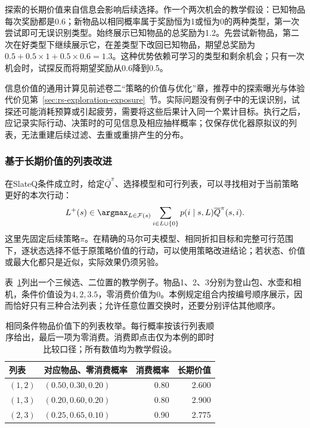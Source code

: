 探索的长期价值来自信息会影响后续选择。作一个两次机会的教学假设：已知物品每次奖励都是0.6；新物品以相同概率属于奖励恒为1或恒为0的两种类型，第一次尝试即可无误识别类型。始终展示已知物品的总奖励为1.2。先尝试新物品，第二次在好类型下继续展示它，在差类型下改回已知物品，期望总奖励为$0.5+0.5\times1+0.5\times0.6=1.3$。这种优势依赖可学习的类型和剩余机会；只有一次机会时，试探反而将期望奖励从0.6降到0.5。

信息价值的通用计算见前述卷二“策略的价值与优化”章，推荐中的探索曝光与体验代价见第~\ref{sec:rs-exploration-exposure}~节。实际问题没有例子中的无误识别，试探还可能消耗预算或引起疲劳，需要将这些后果计入同一个累计目标。执行之后，应记录实际行动、决策时的可见信息及相应抽样概率；仅保存优化器原拟议的列表，无法重建后续过滤、去重或重排产生的分布。

\subsubsection{基于长期价值的列表改进}
\label{sec:rs-long-term-slate-improvement}

在SlateQ条件成立时，给定$\overline Q^\pi$、选择模型和可行列表，可以寻找相对于当前策略更好的本次行动：
\begin{equation}
 L^+(s)\in\argmax_{L\in\mathcal{F}(s)}
 \sum_{i\in L\cup\{0\}}
 p(i\mid s,L)\overline Q^\pi(s,i).
 \label{eq:rs-long-term-slate-improvement}
\end{equation}
这里先固定后续策略$\pi$。在精确的马尔可夫模型、相同折扣目标和完整可行范围下，逐状态选择不低于原策略价值的行动，可以使用策略改进结论；若状态、价值或最大化都只是近似，实际效果仍须另验。

表~\ref{tab:rs-long-term-slate-example}列出一个三候选、二位置的教学例子。物品1、2、3分别为登山包、水壶和相机，条件价值设为$4,2,3.5$，零消费价值为0。本例规定组合内按编号顺序展示，因而恰好只有三种合法列表；允许任意位置交换时，还要分别评估其他顺序。

\begin{table}[htbp]
 \centering
 \small
 \begin{tabularx}{\linewidth}{@{}lXrr@{}}
  \toprule
  列表 & 对应物品、零消费概率 & 消费概率 & 长期价值 \\
  \midrule
  $(1,2)$ & $(0.50,0.30,0.20)$ & 0.80 & 2.600 \\
  $(1,3)$ & $(0.20,0.60,0.20)$ & 0.80 & 2.900 \\
  $(2,3)$ & $(0.25,0.65,0.10)$ & 0.90 & 2.775 \\
  \bottomrule
 \end{tabularx}
 \caption{相同条件物品价值下的列表枚举。每行概率按该行列表顺序给出，最后一项为零消费。消费即点击仅为本例的即时比较口径；所有数值均为教学假设。}
 \label{tab:rs-long-term-slate-example}
\end{table}

